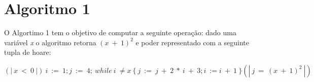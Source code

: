 \section{Algoritmo 1}
\label{sec:alg1}

O Algortimo 1 tem o objetivo de computar a seguinte operação: dado uma variável
\emph{x} o algoritmo retorna $(x\ +\ 1)^2$ e poder representado com a seguinte
tupla de hoare:

$$(\!|\ x\ <\ 0\ |\!)\ i\ :=\ 1; j\ :=\ 4;\ while\ i\ \neq x\ \{\ j\ :=\ j\ +\ 2\ *\ i\ +\ 3; i\ := i\ +\ 1\ \}(\!|\ j\ =\ (x\ +\ 1)^2\ |\!)$$
